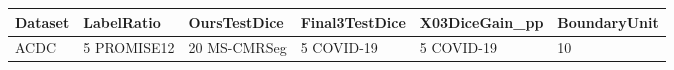 \begin{tabular}{llllll}
Dataset & LabelRatio & OursTestDice & Final3TestDice & X03DiceGain_pp & BoundaryUnit \\
\hline
ACDC & 5%
PROMISE12 & 20%
MS-CMRSeg & 5%
COVID-19 & 5%
COVID-19 & 10%
\end{tabular}
